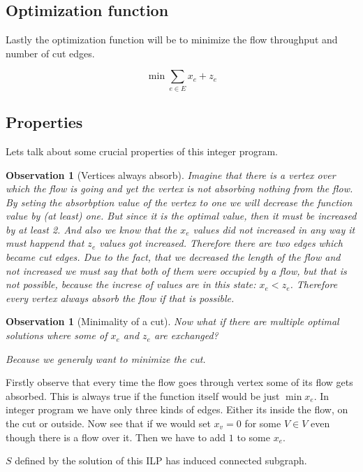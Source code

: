 \documentclass{article}
\theoremstyle{plain}
\newtheorem{observ}[thm]{Observation}
\theoremstyle{plain}
\theoremstyle{remark}
\begin{document}
	\subsection{Optimization function}
	
	Lastly the optimization function will be to minimize the flow throughput and number of cut edges.
	
	$$
	\min \sum_{e \in E} x_e + z_e
	$$
	
	\subsection{Properties}
	
	Lets talk about some crucial properties of this integer program.
		
	\begin{observ}[Vertices always absorb]
		Imagine that there is a vertex over which the flow is going and yet the vertex is not absorbing nothing from the flow. By seting the absorbption value of the vertex to one we will decrease the function value by (at least) one. But since it is the optimal value, then it must be increased by at least 2. And also we know that the $x_e$ values did not increased in any way it must happend that $z_e$ values got increased. Therefore there are two edges which became cut edges. Due to the fact, that we decreased the length of the flow and not increased we must say that both of them were occupied by a flow, but that is not possible, because the increse of values are in this state: $x_e < z_e$. Therefore every vertex always absorb the flow if that is possible.
	\end{observ}
	
	\begin{observ}[Minimality of a cut]
		Now what if there are multiple optimal solutions where some of $x_e$ and $z_e$ are exchanged?
		
		Because we generaly want to minimize the cut.
	\end{observ}
	
	\begin{todo}
		Firstly observe that every time the flow goes through vertex some of its flow gets absorbed. This is always true if the function itself would be just $\min x_e$. In integer program we have only three kinds of edges. Either its inside the flow, on the cut or outside. Now see that if we would set $x_v = 0$ for some $V \in V$ even though there is a flow over it. Then we have to add $1$ to some $x_e$.
		
		$S$ defined by the solution of this ILP has induced connected subgraph.
	\end{todo}
\end{document}
